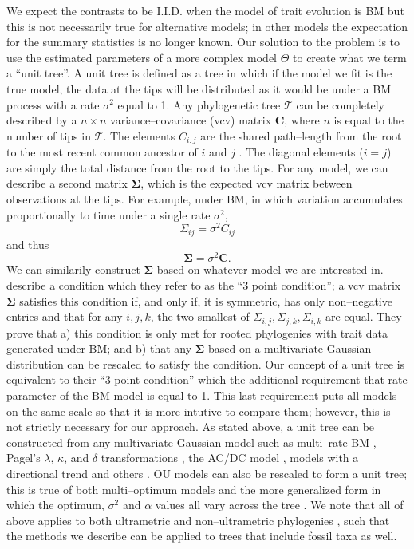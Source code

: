 \documentclass[a4paper,12pt]{article}
\begin{document}
We expect the contrasts to be I.I.D. when the model of trait evolution is BM but this is not necessarily true for alternative models; in other models the expectation for the summary statistics is no longer known. Our solution to the problem is to use the estimated parameters of a more complex model $\Theta$ to create what we term a ``unit tree''. A unit tree is defined as a tree in which if the model we fit is the true model, the data at the tips will be distributed as it would be under a BM process with a rate $\sigma^2$ equal to 1. Any phylogenetic tree $\mathcal{T}$ can be completely described by a $n \times n$ variance--covariance (vcv) matrix $\mathbf{C}$, where $n$ is equal to the number of tips in $\mathcal{T}$. The elements $C_{i,j}$ are the shared path--length from the root to the most recent common ancestor of $i$ and $j$ \citep{Piazza1975}. The diagonal elements ($i = j$) are simply the total distance from the root to the tips. For any model, we can describe a second matrix $\mathbf{\Sigma}$, which is the expected vcv matrix between observations at the tips. For example, under BM, in which variation accumulates proportionally to time under a single rate $\sigma^2$,
\begin{equation}
\Sigma_{ij} = \sigma^2 C_{ij}
\end{equation}
and thus
\begin{equation}
\mathbf{\Sigma} = \sigma^2 \mathbf{C}.
\end{equation}
We can similarily construct $\mathbf{\Sigma}$ based on whatever model we are interested in. \citet{HoAne2013} describe a condition which they refer to as the ``3 point condition''; a vcv matrix $\mathbf{\Sigma}$ satisfies this condition if, and only if, it is symmetric, has only non--negative entries and that for any $i,j,k$, the two smallest of $\Sigma_{i,j}, \Sigma_{j,k}, \Sigma_{i,k}$ are equal. They prove that a) this condition is only met for rooted phylogenies with trait data generated under BM; and b) that any $\mathbf{\Sigma}$ based on a multivariate Gaussian distribution can be rescaled to satisfy the condition. Our concept of a unit tree is equivalent to their ``3 point condition'' which the additional requirement that rate parameter of the BM model is equal to 1. This last requirement puts all models on the same scale so that it is more intutive to compare them; however, this is not strictly necessary for our approach. As stated above, a unit tree can be constructed from any multivariate Gaussian model such as multi--rate BM \citep{Omeara2006, Thomas2006, Eastman2011, Revell2012, Motmot}, Pagel's $\lambda$, $\kappa$, and $\delta$ transformations \citep{Pagel1997, Pagel1999}, the AC/DC model \citep{Blomberg2003} \citep[a.k.a. `EB';][]{Harmon2010, SlaterPennell}, models with a directional trend \citep{Hunt2007} and others \citep[e.g.][]{SlaterMEE}. OU models can also be rescaled to form a unit tree; this is true of both multi--optimum \citep{ButlerKing2004} models and the more generalized form \citep{Beaulieu2012, IngramMahler, UyedaBayou} in which the optimum, $\sigma^2$ and $\alpha$ values all vary across the tree \citep{HoAne2013}. We note that all of above applies to both ultrametric and non--ultrametric phylogenies \citep{HoAne2013}, such that the methods we describe can be applied to trees that include fossil taxa as well.
\end{document}
